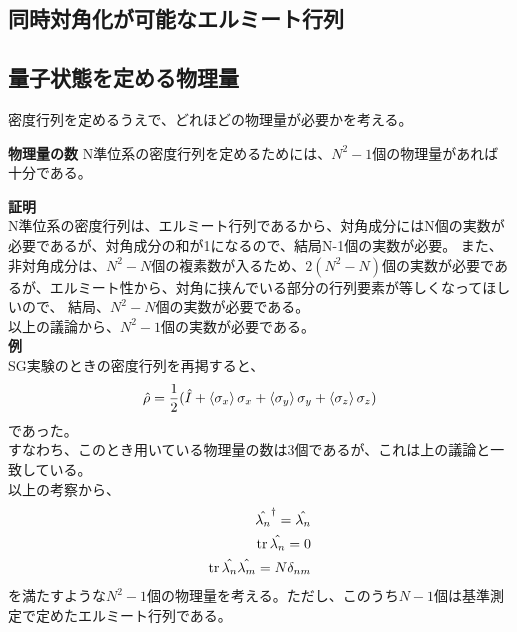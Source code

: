 \documentclass[a4paper,11pt]{jsarticle}
\begin{document}
\subsection{同時対角化が可能なエルミート行列}

\subsection{量子状態を定める物理量}
密度行列を定めるうえで、どれほどの物理量が必要かを考える。\\
\begin{itembox}[l]{\textbf{物理量の数}}
    N準位系の密度行列を定めるためには、$N^2-1$個の物理量があれば十分である。
\end{itembox}
\textbf{証明}\\
N準位系の密度行列は、エルミート行列であるから、対角成分にはN個の実数が必要であるが、対角成分の和が1になるので、結局N-1個の実数が必要。
また、非対角成分は、$N^2-N$個の複素数が入るため、$2(N^2-N)$個の実数が必要であるが、エルミート性から、対角に挟んでいる部分の行列要素が等しくなってほしいので、
結局、$N^2-N$個の実数が必要である。\\
以上の議論から、$N^2-1$個の実数が必要である。\\

\textbf{例}\\
SG実験のときの密度行列を再掲すると、
\begin{align}
    \hat{\rho} = \frac{1}{2}(\hat I + \ev{\sigma_x}\sigma_x + \ev{\sigma_y}\sigma_y + \ev{\sigma_z}\sigma_z)
\end{align}
であった。\\
すなわち、このとき用いている物理量の数は3個であるが、これは上の議論と一致している。\\
以上の考察から、
\begin{align}
    \hat{\lambda_n}^\dagger = \hat{\lambda_n}\\
    \trace{\hat{\lambda_n}} = 0\\
    \trace{\hat{\lambda_n}\hat{\lambda_m}} = N\delta_{nm}
\end{align}
を満たすような$N^2-1$個の物理量を考える。ただし、このうち$N-1$個は基準測定で定めたエルミート行列である。\\
\end{document}
